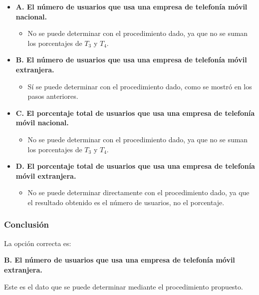 \documentclass[
]{article}
\providecommand{\tightlist}{%
  \setlength{\itemsep}{0pt}\setlength{\parskip}{0pt}}
\begin{document}
\begin{itemize}
\tightlist
\item
  \textbf{A. El número de usuarios que usa una empresa de telefonía
  móvil nacional.}

  \begin{itemize}
  \tightlist
  \item
    No se puede determinar con el procedimiento dado, ya que no se suman
    los porcentajes de \(T_3\) y \(T_4\).
  \end{itemize}
\item
  \textbf{B. El número de usuarios que usa una empresa de telefonía
  móvil extranjera.}

  \begin{itemize}
  \tightlist
  \item
    Sí se puede determinar con el procedimiento dado, como se mostró en
    los pasos anteriores.
  \end{itemize}
\item
  \textbf{C. El porcentaje total de usuarios que usa una empresa de
  telefonía móvil nacional.}

  \begin{itemize}
  \tightlist
  \item
    No se puede determinar con el procedimiento dado, ya que no se suman
    los porcentajes de \(T_3\) y \(T_4\).
  \end{itemize}
\item
  \textbf{D. El porcentaje total de usuarios que usa una empresa de
  telefonía móvil extranjera.}

  \begin{itemize}
  \tightlist
  \item
    No se puede determinar directamente con el procedimiento dado, ya
    que el resultado obtenido es el número de usuarios, no el
    porcentaje.
  \end{itemize}
\end{itemize}

\subsubsection{Conclusión}\label{conclusiuxf3n-9}

La opción correcta es:

\textbf{B. El número de usuarios que usa una empresa de telefonía móvil
extranjera.}

Este es el dato que se puede determinar mediante el procedimiento
propuesto.
\end{document}
